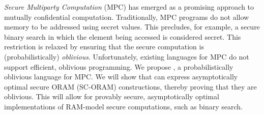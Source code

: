 \emph{Secure Multiparty Computation} (MPC) has emerged as a promising approach to mutually confidential computation.
Traditionally, MPC programs do not allow memory to be addressed using secret values. This precludes, for example,
a secure binary search in which the element being accessed is considered secret.
This restriction is relaxed by ensuring that the secure computation is (probabilistically) \emph{oblivious}.
Unfortunately, existing languages for MPC do not support efficient, oblivious programming. We propose \lang,
a probabilistically oblivious language for MPC. We will show that \lang can express asymptotically optimal
secure ORAM (SC-ORAM) constructions, thereby proving that they are oblivious. This will allow for provably secure,
asymptotically optimal implementations of RAM-model secure computations, such as binary search.
